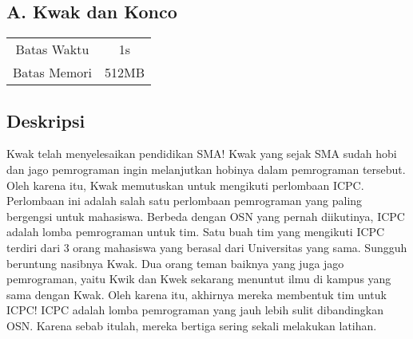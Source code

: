 \documentclass{article}
\begin{document}
\begin{center}
    \section*{A. Kwak dan Konco} %

    \begin{tabular}{ | c c | }
        \hline
        Batas Waktu  & 1s \\    %
        Batas Memori & 512MB \\  %
        \hline
    \end{tabular}
\end{center}

\subsection*{Deskripsi}



Kwak telah menyelesaikan pendidikan SMA! Kwak yang sejak SMA sudah hobi dan jago pemrograman ingin melanjutkan hobinya dalam pemrograman tersebut. Oleh karena itu, Kwak memutuskan untuk mengikuti perlombaan ICPC. Perlombaan ini adalah salah satu perlombaan pemrograman yang paling bergengsi untuk mahasiswa.
Berbeda dengan OSN yang pernah diikutinya, ICPC adalah lomba pemrograman untuk tim. Satu buah tim yang mengikuti ICPC terdiri dari 3 orang mahasiswa yang berasal dari Universitas yang sama. Sungguh beruntung nasibnya Kwak. Dua orang teman baiknya yang juga jago pemrograman, yaitu Kwik dan Kwek sekarang menuntut ilmu di kampus yang sama dengan Kwak. Oleh karena itu, akhirnya mereka membentuk tim untuk ICPC!
ICPC adalah lomba pemrograman yang jauh lebih sulit dibandingkan OSN. Karena sebab itulah, mereka bertiga sering sekali melakukan latihan.
\end{document}
